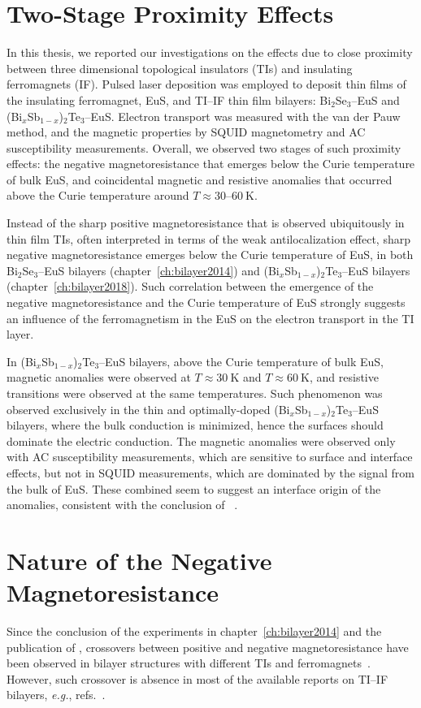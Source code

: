 \section{Two-Stage Proximity Effects}
In this thesis, we reported our investigations on the effects due to close proximity between three dimensional topological insulators (TIs) and insulating ferromagnets (IF). Pulsed laser deposition was employed to deposit thin films of the insulating ferromagnet, EuS, and TI--IF thin film bilayers: Bi$_2$Se$_3$--EuS and (Bi$_x$Sb$_{1-x}$)$_2$Te$_3$--EuS. Electron transport was measured with the van der Pauw method, and the magnetic properties by SQUID magnetometry and AC susceptibility measurements. Overall, we observed two stages of such proximity effects: the negative magnetoresistance that emerges below the Curie temperature of bulk EuS, and coincidental magnetic and resistive anomalies that occurred above the Curie temperature around $T\approx30$--$60~\mathrm{K}$.

Instead of the sharp positive magnetoresistance that is observed ubiquitously in thin film TIs, often interpreted in terms of the weak antilocalization effect, sharp negative magnetoresistance emerges below the Curie temperature of EuS, in both Bi$_2$Se$_3$--EuS bilayers (chapter~\ref{ch:bilayer2014}) and (Bi$_x$Sb$_{1-x}$)$_2$Te$_3$--EuS bilayers (chapter~\ref{ch:bilayer2018}). Such correlation between the emergence of the negative magnetoresistance and the Curie temperature of EuS strongly suggests an influence of the ferromagnetism in the EuS on the electron transport in the TI layer.

In (Bi$_x$Sb$_{1-x}$)$_2$Te$_3$--EuS bilayers, above the Curie temperature of bulk EuS, magnetic anomalies were observed at $T\approx30~\mathrm{K}$ and $T\approx60~\mathrm{K}$, and resistive transitions were observed at the same temperatures. Such phenomenon was observed exclusively in the thin and optimally-doped (Bi$_x$Sb$_{1-x}$)$_2$Te$_3$--EuS bilayers, where the bulk conduction is minimized, hence the surfaces should dominate the electric conduction. The magnetic anomalies were observed only with AC susceptibility measurements, which are sensitive to surface and interface effects, but not in SQUID measurements, which are dominated by the signal from the bulk of EuS. These combined seem to suggest an interface origin of the anomalies, consistent with the conclusion of \citeauthor{Moodera2016}~\cite{Moodera2016}.

\section{Nature of the Negative Magnetoresistance}
Since the conclusion of the experiments in chapter~\ref{ch:bilayer2014} and the publication of \cite{bilayer2014}, crossovers between positive and negative magnetoresistance have been observed in bilayer structures with different TIs and ferromagnets~\cite{Samarth2017, Tian2016}. However, such crossover is absence in most of the available reports on TI--IF bilayers, \textit{e.g.}, refs.~\cite{Shi2014, Petta2014, Wang2014, Tian2016, Qiu2017}.

